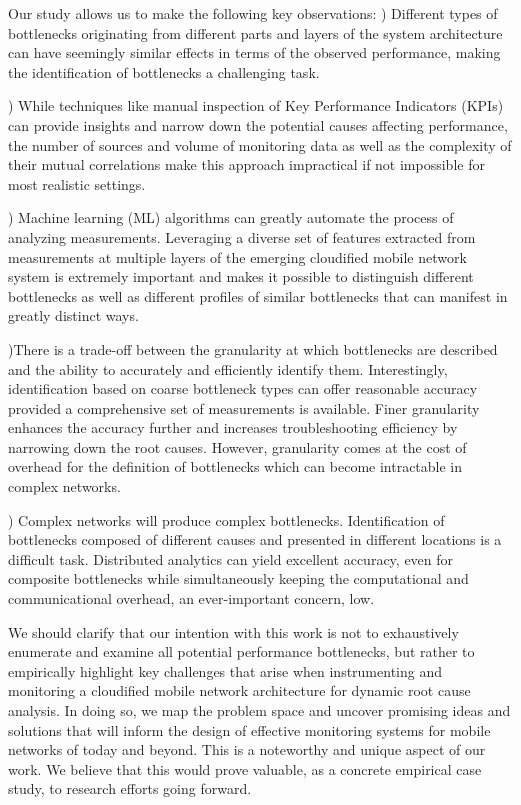 \documentclass[journal,comsoc]{IEEEtran}
\begin{document}
%
Our study allows us to make the following key observations:
) Different types of bottlenecks originating from different parts and layers of the system architecture can have seemingly similar effects in terms of the observed performance, making the identification of bottlenecks a challenging task.

) While techniques like manual inspection of Key Performance Indicators (KPIs) can provide insights and narrow down the potential causes affecting performance, the number of sources and volume of monitoring data as well as the complexity of their mutual correlations make this approach impractical if not impossible for most realistic settings.

) Machine learning (ML) algorithms can greatly automate the process of analyzing measurements. Leveraging a diverse set of features extracted from measurements at multiple layers of the emerging cloudified mobile network system is extremely important and makes it possible to distinguish different bottlenecks as well as different profiles of similar bottlenecks that can manifest in greatly distinct ways. 

)There is a trade-off between the granularity at which bottlenecks are described and the ability to accurately and efficiently identify them.
Interestingly, identification based on coarse bottleneck types can offer reasonable accuracy provided a comprehensive set of measurements is available. Finer granularity enhances the accuracy further and increases troubleshooting efficiency by narrowing down the root causes. However, granularity comes at the cost of overhead for the definition of bottlenecks which can become intractable in complex networks.  


) Complex networks will produce complex bottlenecks. Identification of bottlenecks composed of different causes and presented in different locations is a difficult task. Distributed analytics can yield excellent accuracy, even for composite bottlenecks while simultaneously keeping the computational and communicational overhead, an ever-important concern, low. 

% 
\bigskip
We should clarify that our intention with this work is not to exhaustively enumerate and examine all potential performance bottlenecks, but rather to empirically highlight key challenges that arise when instrumenting and monitoring a cloudified mobile network architecture for dynamic root cause analysis. In doing so, we map the problem space and uncover promising ideas and solutions that will inform the design of effective monitoring systems for mobile networks of today and beyond. This is a noteworthy and unique aspect of our work. We believe that this would prove valuable, as a concrete empirical case study, to research efforts going forward.
\end{document}
